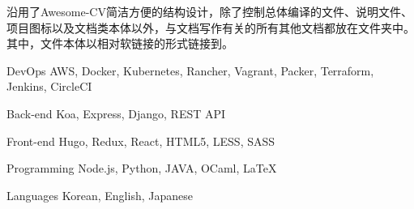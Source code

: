 
\begin{cvparagraph}
\dk 沿用了Awesome-CV简洁方便的结构设计，除了控制总体编译的文件、说明文件、项目图标以及文档类本体以外，与文档写作有关的所有其他文档都放在文件夹中。其中，文件本体以相对软链接的形式链接到。
\end{cvparagraph}

\begin{cvskills}

  \cvskill
    {DevOps} %
    {AWS, Docker, Kubernetes, Rancher, Vagrant, Packer, Terraform, Jenkins, CircleCI} %

  \cvskill
    {Back-end} %
    {Koa, Express, Django, REST API} %

  \cvskill
    {Front-end} %
    {Hugo, Redux, React, HTML5, LESS, SASS} %

  \cvskill
    {Programming} %
    {Node.js, Python, JAVA, OCaml, LaTeX} %

  \cvskill
    {Languages} %
    {Korean, English, Japanese} %

\end{cvskills}

\clearpage
